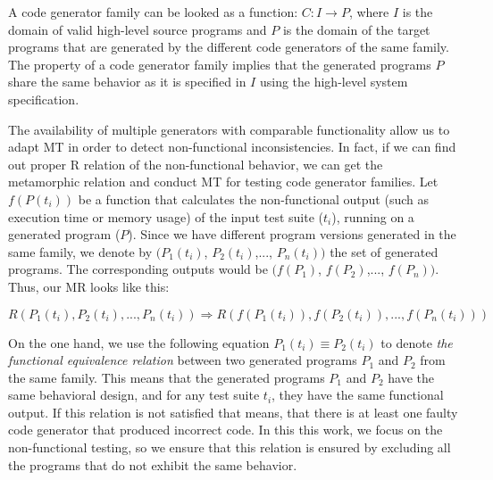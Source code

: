 A code generator family can be looked as a function: $C : I \rightarrow P$, where $I$ is the domain of valid high-level source programs and $P$ is the domain of the target programs that are generated by the different code generators of the same family. The property of a code generator family implies that the generated programs $P$ share the same behavior as it is specified in $I$ using the high-level system specification. 


The availability of multiple generators with comparable functionality allow us to adapt MT in order to detect non-functional inconsistencies. In fact, if we can find out proper R relation of the non-functional behavior, we can get the metamorphic relation and conduct MT for testing code generator families.
Let $f(P(t_{i}))$ be a function that calculates the non-functional output (such as execution time or memory usage) of the input test suite ($t_{i}$), running on a generated program ($P$). Since we have different program versions generated in the same family, we denote by $(P_{1}(t_{i})$, $P_{2}(t_{i})$,..., $P_{n}(t_{i}))$ the set of generated programs. The corresponding outputs would be $(f(P_{1})$, $f(P_{2})$,..., $f(P_{n}))$. Thus, our MR looks like this:

\begin{equation}
	 R(P_{1}(t_{i}), P_{2}(t_{i}),..., P_{n}(t_{i}))  \Rightarrow R(f(P_{1}(t_{i})), f(P_{2}(t_{i})),..., f(P_{n}(t_{i})))
\end{equation}

On the one hand, we use the following equation $P_{1}(t_{i}) \equiv P_{2}(t_{i})$ to denote \textit{the functional equivalence relation} between two generated programs $P_{1}$ and $P_{2}$ from the same family. This means that the generated programs $P_{1}$ and $P_{2}$ have the same behavioral design, and for any test suite $t_{i}$, they have the same functional output. 
If this relation is not satisfied that means, that there is at least one faulty code generator that produced incorrect code. In this this work, we focus on the non-functional testing, so we ensure that this relation is ensured by excluding all the programs that do not exhibit the same behavior. 


